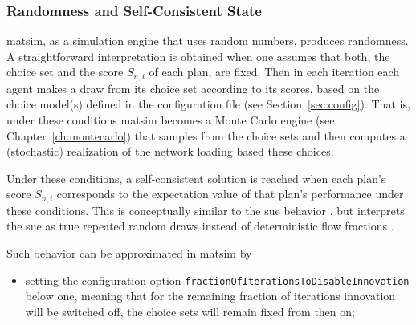 \begin{oframed}
%
%
\subsubsection{Randomness and Self-Consistent State}
\label{ch:economicEval:describingBehavior:discreteChoice:quenchedVsAnnealed}
%
%
\acrshort{matsim}, as a simulation engine that uses random numbers, produces randomness.
%
A straightforward interpretation is obtained when one assumes that both, the choice set and the score $S_{n,i}$ of each plan, 
%
%
are fixed. Then in each iteration each agent makes a draw from its choice set according to its scores, based on the choice model(s) defined in the configuration file (see Section~\ref{sec:config}).
%
%
%
That is, under these conditions \acrshort{matsim} becomes a Monte Carlo engine
%
(see Chapter~\ref{ch:montecarlo})
%
%
%
that samples from the choice sets and then computes a (stochastic) realization of the network loading based these choices.

Under these conditions, a self-consistent solution is reached when each plan's score $S_{n,i}$ corresponds to the expectation value of that plan's performance under these conditions.
%
%
%
This is conceptually similar to the \gls{sue} behavior \citep{DaganzoSheffi1977SUE}, but interprets the \gls{sue} as true repeated random draws instead of deterministic flow fractions \citep{NagelFloetteroed2009IatbrResourceInBook}.

Such behavior can be approximated
%
%
in \acrshort{matsim} by
%
\begin{itemize}\styleItemize
\item setting the configuration option \verb$fractionOfIterationsToDisableInnovation$ below one,  meaning that for the remaining fraction of iterations innovation will be switched off, \ie the choice sets will remain fixed from then on;


\end{itemize}
\end{oframed}
